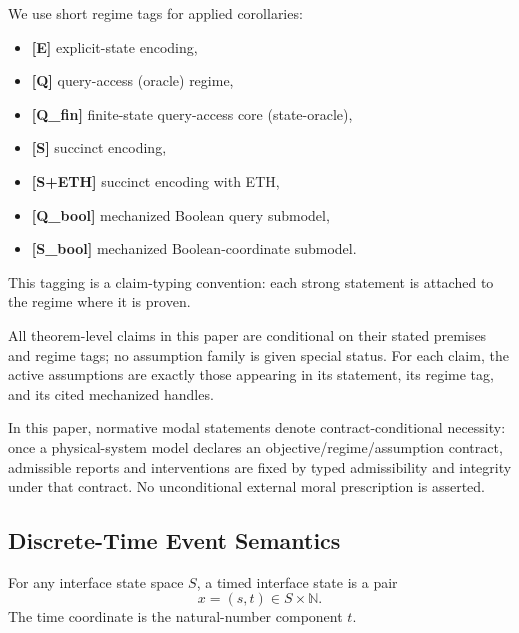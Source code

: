 We use short regime tags for applied corollaries:
\begin{itemize}
\item \textbf{[E]} explicit-state encoding,
\item \textbf{[Q]} query-access (oracle) regime,
\item \textbf{[Q\_fin]} finite-state query-access core (state-oracle),
\item \textbf{[S]} succinct encoding,
\item \textbf{[S+ETH]} succinct encoding with ETH,
\item \textbf{[Q\_bool]} mechanized Boolean query submodel,
\item \textbf{[S\_bool]} mechanized Boolean-coordinate submodel.
\end{itemize}

This tagging is a claim-typing convention: each strong statement is attached to the regime where it is proven.

\begin{remark}\label{rem:uniform-assumption-discipline}
All theorem-level claims in this paper are conditional on their stated premises and regime tags; no assumption family is given special status.
For each claim, the active assumptions are exactly those appearing in its statement, its regime tag, and its cited mechanized handles.
\end{remark}

\begin{remark}\label{rem:modal-should}
In this paper, normative modal statements denote contract-conditional necessity: once a physical-system model declares an objective/regime/assumption contract, admissible reports and interventions are fixed by typed admissibility and integrity under that contract.
No unconditional external moral prescription is asserted.
\end{remark}

\subsection{Discrete-Time Event Semantics}\label{sec:discrete-time-semantics}

\begin{definition}\label{def:timed-interface-state}
For any interface state space $S$, a timed interface state is a pair
\[
x=(s,t)\in S\times \mathbb{N}.
\]
The time coordinate is the natural-number component $t$.
\end{definition}

